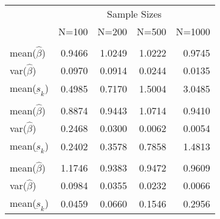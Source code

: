
\begin{tabular}{lrrrr}
\toprule
\multicolumn{1}{c}{ } & \multicolumn{4}{c}{Sample Sizes} \\
\cmidrule(l{3pt}r{3pt}){2-5}
  & N=100 & N=200 & N=500 & N=1000\\
\midrule
\addlinespace[0.3em]
\multicolumn{5}{l}{\textbf{$ \rho = 0 $  }}\\
\hspace{1em}mean($\hat{\beta}$) & 0.9466 & 1.0249 & 1.0222 & 0.9745\\
\hspace{1em}var($\hat{\beta}$) & 0.0970 & 0.0914 & 0.0244 & 0.0135\\
\hspace{1em}mean($\underbar{s}_k$) & 0.4985 & 0.7170 & 1.5004 & 3.0485\\
\addlinespace[0.3em]
\multicolumn{5}{l}{\textbf{$ \rho = 0.5 $}}\\
\hspace{1em}mean($\hat{\beta}$) & 0.8874 & 0.9443 & 1.0714 & 0.9410\\
\hspace{1em}var($\hat{\beta}$) & 0.2468 & 0.0300 & 0.0062 & 0.0054\\
\hspace{1em}mean($\underbar{s}_k$) & 0.2402 & 0.3578 & 0.7858 & 1.4813\\
\addlinespace[0.3em]
\multicolumn{5}{l}{\textbf{$ \rho = 0.9 $}}\\
\hspace{1em}mean($\hat{\beta}$) & 1.1746 & 0.9383 & 0.9472 & 0.9609\\
\hspace{1em}var($\hat{\beta}$) & 0.0984 & 0.0355 & 0.0232 & 0.0066\\
\hspace{1em}mean($\underbar{s}_k$) & 0.0459 & 0.0660 & 0.1546 & 0.2956\\
\bottomrule
\end{tabular}

